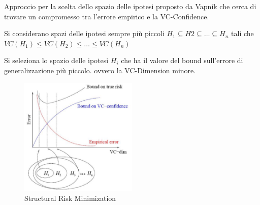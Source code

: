 Approccio per la scelta dello spazio delle ipotesi proposto da Vapnik
che cerca di trovare un compromesso tra l'errore empirico e la
VC-Confidence.

Si considerano spazi delle ipotesi sempre più piccoli $H_1 \subseteq H2 \subseteq \ldots \subseteq H_n$ tali che $ VC(H_1) \leq VC(H_2) \leq \ldots \leq VC(H_n)$

Si seleziona lo spazio delle ipotesi $H_i$ che ha il valore del bound
sull'errore di generalizzazione più piccolo. ovvero la VC-Dimension minore.

\begin{figure}[htbp]
\centering
\includegraphics[width=0.5\textwidth]{./notes/immagini/l5-srm.png}
\caption{Structural Risk Minimization}
\end{figure}
